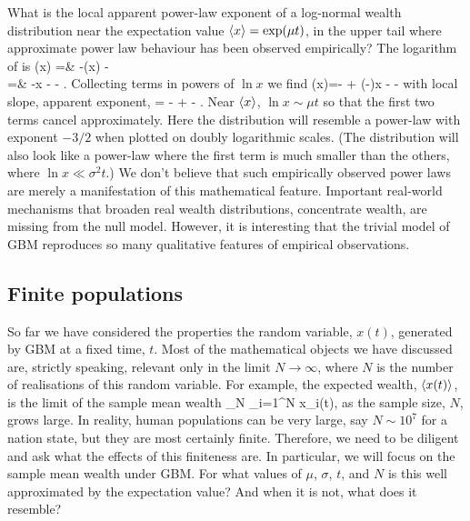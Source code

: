 What is the local apparent power-law exponent of a log-normal wealth distribution near the 
expectation value $\left\langle x \right\rangle=\exp(\mu t)$, \ie in the upper tail where approximate power law behaviour
has been observed empirically? The logarithm of  is
\bea
\ln \PDF(x) =& -\ln\left(x\right) -\\
=& -\ln x - - .
\eea
Collecting terms in powers of $\ln x$ we find
\be
\ln \PDF(x)=-  + \left(-\right)\ln x - -
\ee
with local slope, \ie apparent exponent,
\be
{} = -   +  - .
\ee
Near $\left\langle x \right\rangle$, $\ln x \sim \mu t$ so that the first two terms cancel approximately. Here the distribution will resemble a power-law with exponent $-3/2$ when plotted on doubly logarithmic scales. (The distribution will also look like a power-law where the first term is much smaller than the others, \eg where $\ln x \ll \sigma^2 t$.) We don't believe that such empirically observed power laws are merely a manifestation of this mathematical feature. Important real-world  mechanisms that broaden real wealth distributions, \ie concentrate wealth, are missing from the null model. However, it is interesting that the trivial model of GBM reproduces so many qualitative features of empirical observations. 


\subsection{Finite populations}
So far we have considered the properties the random variable, $x(t)$, generated by GBM at a fixed time, $t$. Most of the mathematical objects we have discussed are, strictly speaking, relevant only in the limit $N\to\infty$, where $N$ is the number of realisations of this random variable. For example, the expected wealth, $\left\langle x(t) \right\rangle$, is the limit of the sample mean wealth
\be
{}_N \equiv {}\sum_{i=1}^N x_i(t),
\ee
as the sample size, $N$, grows large. In reality, human populations can be very large, say $N\sim10^7$ for a nation state, but they are most certainly finite. Therefore, we need to be diligent and ask what the effects of this finiteness are. In particular, we will focus on the sample mean wealth under GBM. For what values of $\mu$, $\sigma$, $t$, and $N$ is this well approximated by the expectation value? And when it is not, what does it resemble?

